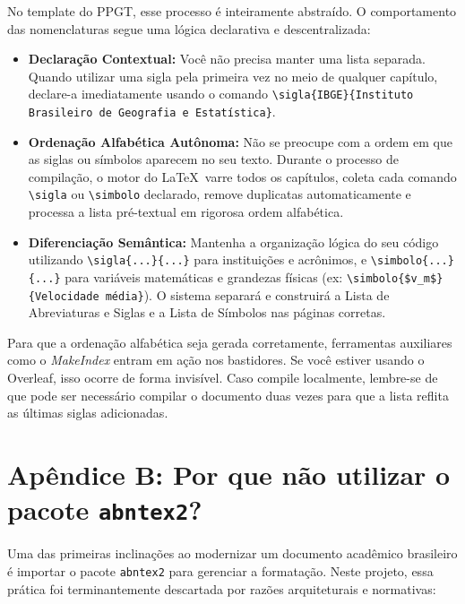 \documentclass[a4paper,12pt]{article}
\begin{document}
No template do PPGT, esse processo é inteiramente abstraído. O comportamento das nomenclaturas segue uma lógica declarativa e descentralizada:

\begin{itemize}
    \item \textbf{Declaração Contextual:} Você não precisa manter uma lista separada. Quando utilizar uma sigla pela primeira vez no meio de qualquer capítulo, declare-a imediatamente usando o comando \texttt{\textbackslash sigla\{IBGE\}\{Instituto Brasileiro de Geografia e Estatística\}}. 
    \item \textbf{Ordenação Alfabética Autônoma:} Não se preocupe com a ordem em que as siglas ou símbolos aparecem no seu texto. Durante o processo de compilação, o motor do \LaTeX \ varre todos os capítulos, coleta cada comando \texttt{\textbackslash sigla} ou \texttt{\textbackslash simbolo} declarado, remove duplicatas automaticamente e processa a lista pré-textual em rigorosa ordem alfabética.
    \item \textbf{Diferenciação Semântica:} Mantenha a organização lógica do seu código utilizando \texttt{\textbackslash sigla\{...\}\{...\}} para instituições e acrônimos, e \texttt{\textbackslash simbolo\{...\}\{...\}} para variáveis matemáticas e grandezas físicas (ex: \texttt{\textbackslash simbolo\{\$v\_m\$\}\{Velocidade média\}}). O sistema separará e construirá a Lista de Abreviaturas e Siglas e a Lista de Símbolos nas páginas corretas.
\end{itemize}

\begin{atencao}
Para que a ordenação alfabética seja gerada corretamente, ferramentas auxiliares como o \textit{MakeIndex} entram em ação nos bastidores. Se você estiver usando o Overleaf, isso ocorre de forma invisível. Caso compile localmente, lembre-se de que pode ser necessário compilar o documento duas vezes para que a lista reflita as últimas siglas adicionadas.
\end{atencao}

\section{Apêndice B: Por que não utilizar o pacote \texttt{abntex2}?}

Uma das primeiras inclinações ao modernizar um documento acadêmico brasileiro é importar o pacote \texttt{abntex2} para gerenciar a formatação. Neste projeto, essa prática foi terminantemente descartada por razões arquiteturais e normativas:
\end{document}
